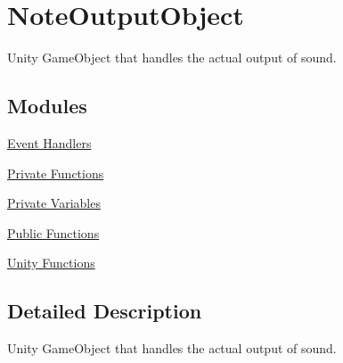 \hypertarget{group___doc_n_o_o}{}\section{Note\+Output\+Object}
\label{group___doc_n_o_o}


Unity Game\+Object that handles the actual output of sound.  


\subsection*{Modules}
\begin{DoxyCompactItemize}
\item 
\hyperlink{group___n_o_o_handlers}{Event Handlers}
\item 
\hyperlink{group___n_o_o_priv_func}{Private Functions}
\item 
\hyperlink{group___n_o_o_priv_var}{Private Variables}
\item 
\hyperlink{group___n_o_o_pub_func}{Public Functions}
\item 
\hyperlink{group___n_o_o_unity}{Unity Functions}
\end{DoxyCompactItemize}


\subsection{Detailed Description}
Unity Game\+Object that handles the actual output of sound. 

